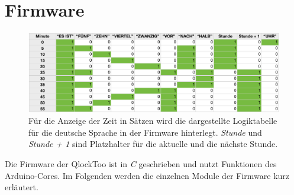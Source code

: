 

\section{Firmware}
\label{sec:Firmware}

\begin{figure}
    \includegraphics[width=\columnwidth]{Abbildungen/Firmware/Logik}
    \caption{Für die Anzeige der Zeit in Sätzen wird die dargestellte Logiktabelle für die deutsche Sprache in der Firmware hinterlegt. \emph{Stunde} und \emph{Stunde + 1} sind Platzhalter für die aktuelle und die nächste Stunde.}
    \label{fig:Logik}
\end{figure}

Die Firmware der QlockToo ist in \emph{C} geschrieben und nutzt Funktionen des Arduino-Cores.
Im Folgenden werden die einzelnen Module der Firmware kurz erläutert.

